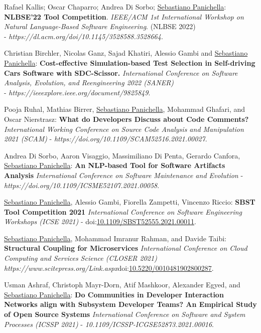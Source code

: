 \documentclass[10pt]{article}
\newcommand\doilink[1]{\href{http://dx.doi.org/#1}{#1}}
\newcommand\doi[1]{doi:\doilink{#1}}
\begin{document}
\begin{bibenum}
   		\item \label{Cm25_2} Rafael Kallis; Oscar Chaparro; Andrea Di Sorbo; \underline{Sebastiano Panichella}: \textbf{NLBSE'22 Tool Competition}.    \emph{IEEE/ACM 1st International Workshop on Natural Language-Based Software Engineering}. (NLBSE 2022)\\ - \textit{https://dl.acm.org/doi/10.1145/3528588.3528664}. 
  		\item \label{Cm24} Christian Birchler, Nicolas Ganz, Sajad Khatiri, Alessio Gambi and \underline{Sebastiano Panichella}:  \textbf{Cost-effective Simulation-based Test Selection in Self-driving Cars Software with SDC-Scissor.}  \emph{International Conference on Software Analysis, Evolution, and Reengineering 2022 (SANER)} \\- \textit{https://ieeexplore.ieee.org/document/9825849}. 
  		\item \label{Cm23} Pooja Ruhal, Mathias Birrer, \underline{Sebastiano Panichella}, Mohammad Ghafari, and Oscar Nierstrasz:  \textbf{What do Developers Discuss about Code Comments?}  \emph{International Working Conference on Source Code Analysis and Manipulation 2021 (SCAM)} - \textit{https://doi.org/10.1109/SCAM52516.2021.00027}.
 		\item \label{Cm22} Andrea Di Sorbo, Aaron Visaggio, Massimiliano Di Penta, Gerardo Canfora, \underline{Sebastiano Panichella}:  \textbf{An NLP-based Tool for Software Artifacts Analysis}  \emph{International Conference on Software Maintenance and Evolution} - \\\textit{https://doi.org/10.1109/ICSME52107.2021.00058}.
 		\item \label{Cm21} \underline{Sebastiano Panichella}, Alessio Gambi, Fiorella Zampetti, Vincenzo Riccio:  \textbf{SBST Tool Competition 2021}  \emph{International Conference on Software Engineering Workshops (ICSE 2021)} - \doi{10.1109/SBST52555.2021.00011}. 
       \item \label{Cm20} \underline{Sebastiano Panichella}, Mohammad Imranur Rahman, and Davide Taibi:  \textbf{Structural Coupling for Microservices}  \emph{International Conference on Cloud Computing and Services Science (CLOSER 2021)}\\ \textit{https://www.scitepress.org/Link.aspx}\doi{10.5220/0010481902800287}. 
       \item \label{Cm19} Usman Ashraf, Christoph Mayr-Dorn, Atif Mashkoor, Alexander Egyed, and \underline{Sebastiano Panichella}:  \textbf{Do Communities in Developer Interaction Networks align with Subsystem Developer Teams? An Empirical Study of Open Source Systems}  \emph{International Conference on Software and System Processes (ICSSP 2021)} - \textit{10.1109/ICSSP-ICGSE52873.2021.00016}.   

\end{bibenum}
\end{document}
